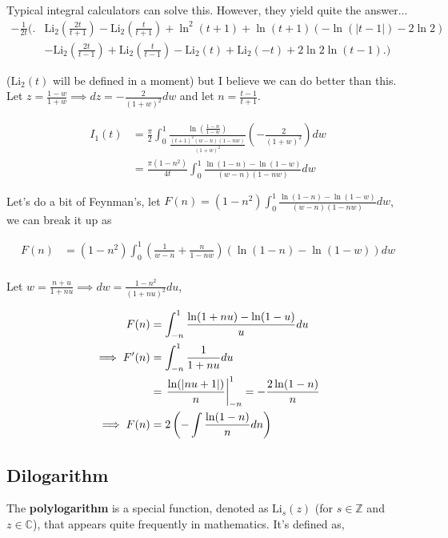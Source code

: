 \documentclass{article}
\newcommand{\Li}[1]{\operatorname{Li_2}{\left(#1\right)}}
\begin{document}
Typical integral calculators can solve this. However, they yield quite the answer... 
\begin{align*}
    -\frac{1}{2t}\Bigg( \Bigg. &\Li{\frac{2t}{t+1}} - \Li{\frac{t}{t+1}} + \ln^2{(t+1)} + \ln{(t+1)}(-\ln{(|t-1|)} - 2\ln 2) \\& - \Li{\frac{2t}{t-1}} + \Li{\frac{t}{t-1}} - \Li{t} + \Li{-t} + 2\ln 2 \ln{(t-1)} \Bigg. \Bigg)
\end{align*}

($\Li{t}$ will be defined in a moment) but I believe we can do better than this. Let $z = \frac{1-w}{1+w} \implies dz = -\frac{2}{(1+w)^2}dw$ and let $n = \frac{t-1}{t+1}$.

\begin{align*}
    I_1{(t)} &= \frac{\pi}{2} \int_{0}^{1}{\frac{\ln{\left( \frac{1-n}{1-w} \right)}}{\frac{(t+1)^2 (w-n)(1-nw)}{(1+w)^2}} \left( -\frac{2}{(1+w)^2} \right)dw} \\
    &= \frac{\pi(1-n^2)}{4t} \int_{0}^{1}{\frac{\ln{(1-n)} - \ln{(1-w)}}{(w-n)(1-nw)}dw}
\end{align*}

Let's do a bit of Feynman's, let $F(n) = (1-n^2)\int_{0}^{1}{\frac{\ln{(1-n)} - \ln{(1-w)}}{(w-n)(1-nw)}dw}$, we can break it up as

\begin{align*}
    F(n) &= (1-n^2) \int_{0}^{1}{ \left( \frac{1}{w-n} + \frac{n}{1-nw} \right) (\ln{(1-n)} - \ln{(1-w)}) dw} \\
\end{align*}

Let $w = \frac{n + u}{1+nu} \implies dw = \frac{1-n^2}{(1+nu)^2} du$,

\begin{align*}
    F(n) &= \int_{-n}^{1}{\frac{\ln(1 + nu) - \ln(1-u)}{u}du} \\ 
    \implies F'(n) &= \int_{-n}^{1}{\frac{1}{1 + nu}du} \\
    &= \evalat*{\frac{\ln(|nu + 1|)}{n}}{1}_{-n} = -\frac{2\ln(1-n)}{n} \\
    \implies F(n) &= 2\left(-\int{\frac{\ln(1-n)}{n} dn}\right)
\end{align*}

\subsection{Dilogarithm}

The \textbf{polylogarithm} is a special function, denoted as $\text{Li}_{s}(z)$ (for $s\in\mathbb{Z}$ and $z\in\mathbb{C}$), that appears quite frequently in mathematics. It's defined as,
\end{document}
